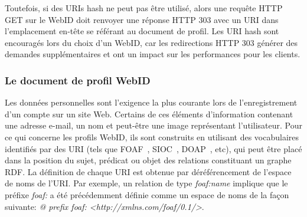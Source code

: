 Toutefois, si des URIs hash ne peut pas être utilisé, alors une requête HTTP GET sur le WebID doit renvoyer une réponse HTTP 303 avec un URI dans l'emplacement en-tête se référant au document de profil. Les URI hash sont encouragés lors du choix d'un WebID, car les redirections HTTP 303 générer des demandes supplémentaires et ont un impact sur les performances pour les clients.

\subsubsection*{Le document de profil WebID}
Les données personnelles sont l'exigence la plus courante lors de l'enregistrement d'un compte sur un site Web. Certains de ces éléments d'information contenant une adresse e-mail, un nom et peut-être une image représentant l'utilisateur. Pour ce qui concerne les profils WebID, ils sont construits en utilisant des vocabulaires identifiés par des URI (tels que FOAF~\cite{foaf}, SIOC~\cite{breslin2005towards}, DOAP~\cite{dumbill2012doap}, etc), qui peut être placé dans la position du sujet, prédicat ou objet des relations constituant un graphe RDF. La définition de chaque URI est obtenue par déréférencement de l'espace de noms de l'URI. Par exemple, un relation de type \textit{foaf:name} implique que le préfixe \textit{foaf:} a été précédemment définie comme un espace de noms de la façon suivante: \textit{@ prefix foaf: <http://xmlns.com/foaf/0.1/>}.\\


